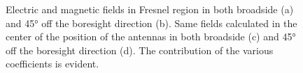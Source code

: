 \documentclass[10 pt,a4paper,twocolumn]{article}
\begin{document}
{\begin{figure}[bt!]
	\centering
	\begin{subfigure}{0.38\linewidth}
		\def\svgwidth{\linewidth}
		\tiny{}
		\caption{}
	\end{subfigure}	\hspace{0.15\linewidth}
	\begin{subfigure}{0.38\linewidth}
		\def\svgwidth{\linewidth}
		\tiny{}
		\caption{}
	\end{subfigure}	
	\begin{subfigure}[b]{0.4\linewidth}
		\def\svgwidth{\linewidth}
		\tiny{}
		\caption{}
	\end{subfigure}
	\begin{subfigure}[t]{0.13\linewidth}
		\def\svgwidth{\linewidth}
		\tiny{}
	\end{subfigure}	
	\begin{subfigure}[b]{0.4\linewidth}
		\def\svgwidth{\linewidth}
		\tiny{}
		\caption{}
	\end{subfigure}
	\caption{Electric and magnetic fields in Fresnel region in both broadside (a) and 45° off the boresight direction (b). Same fields calculated in the center of the position of the antennas in both broadside (c) and 45° off the boresight direction (d). The contribution of the various coefficients is evident.}
	\label{fig:EH field}
\end{figure}


}
\end{document}
